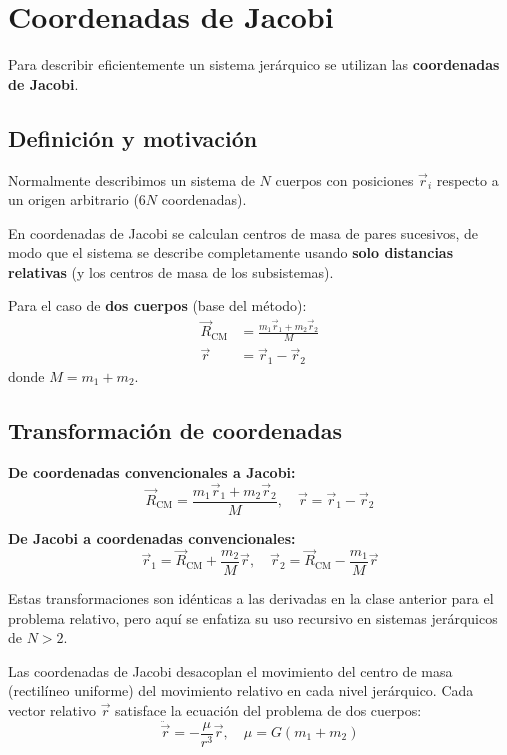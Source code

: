 \documentclass[12pt,oneside]{book}
\begin{document}
\section{Coordenadas de Jacobi}
Para describir eficientemente un sistema jerárquico se utilizan las \textbf{coordenadas de Jacobi}.

\subsection{Definición y motivación}
Normalmente describimos un sistema de \(N\) cuerpos con posiciones \(\vec{r}_i\) respecto a un origen arbitrario (6\(N\) coordenadas).  

En coordenadas de Jacobi se calculan centros de masa de pares sucesivos, de modo que el sistema se describe completamente usando \textbf{solo distancias relativas} (y los centros de masa de los subsistemas).

Para el caso de \textbf{dos cuerpos} (base del método):
\begin{align*}
\vec{R}_{\text{CM}} &= \frac{m_1 \vec{r}_1 + m_2 \vec{r}_2}{M} \\
\vec{r} &= \vec{r}_1 - \vec{r}_2
\end{align*}
donde \(M = m_1 + m_2\).

\subsection{Transformación de coordenadas}
\textbf{De coordenadas convencionales a Jacobi:}
\[
\vec{R}_{\text{CM}} = \frac{m_1 \vec{r}_1 + m_2 \vec{r}_2}{M}, \quad
\vec{r} = \vec{r}_1 - \vec{r}_2
\]

\textbf{De Jacobi a coordenadas convencionales:}
\[
\vec{r}_1 = \vec{R}_{\text{CM}} + \frac{m_2}{M} \vec{r}, \quad
\vec{r}_2 = \vec{R}_{\text{CM}} - \frac{m_1}{M} \vec{r}
\]

Estas transformaciones son idénticas a las derivadas en la clase anterior para el problema relativo, pero aquí se enfatiza su uso recursivo en sistemas jerárquicos de \(N > 2\).

\begin{importante}
Las coordenadas de Jacobi desacoplan el movimiento del centro de masa (rectilíneo uniforme) del movimiento relativo en cada nivel jerárquico. Cada vector relativo \(\vec{r}\) satisface la ecuación del problema de dos cuerpos:
\[
\ddot{\vec{r}} = -\frac{\mu}{r^3}\vec{r}, \quad \mu = G(m_1 + m_2)
\]
\end{importante}
\end{document}
